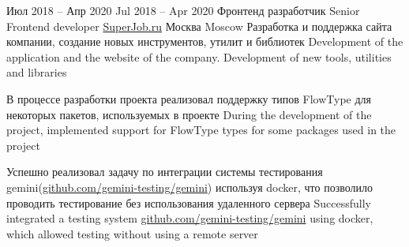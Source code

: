 \cventry
  {\lang
    {Июл 2018 – Апр 2020}
    {Jul 2018 – Apr 2020}}
  {\lang
    {Фронтенд разработчик}
    {Senior Frontend developer}}
  {\href{https://superjob.ru}{SuperJob.ru}}
  {\lang
    {Москва}
    {Moscow}}
  {}
  {\lang
    {Разработка и поддержка сайта компании, создание новых инструментов, утилит и библиотек}
    {Development of the application and the website of the company. Development of new tools, utilities and libraries}}

\cvlistitem
  {\lang
    {В процессе разработки проекта реализовал поддержку типов FlowType для некоторых пакетов, используемых в проекте}
    {During the development of the project, implemented support for FlowType types for some packages used in the project}}

\cvlistitem
  {\lang
    {Успешно реализовал задачу по интеграции системы тестирования gemini(\href{https://github.com/gemini-testing/gemini}{github.com/gemini-testing/gemini}) используя docker, что позволило проводить тестирование без использования удаленного сервера}
    {Successfully integrated a testing system \href{https://github.com/gemini-testing/gemini}{github.com/gemini-testing/gemini} using docker, which allowed testing without using a remote server}}
